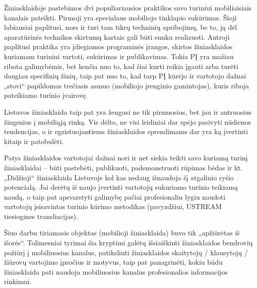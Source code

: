 \documentclass[kursinis-darbas]{vukf}
\begin{document}
%
%

\vukfConclusion

Žiniasklaidoje pastebimos dvi populiariausios praktikos savo turiniui mobiliaisiais kanalais pateikti. Pirmoji yra specialaus mobiliojo tinklapio sukūrimas. Šioji labiausiai paplitusi, nors ir turi tam tikrų techninių apribojimų, be to, ją dėl aparatūrinės technikos skirtumų kartais gali būti sunku realizuoti. Antroji paplitusi praktika yra įdiegiamos programinės įrangos, skirtos žiniasklaidos kuriamam turiniui vartoti, sukūrimas ir publikavimas. Tokia PĮ yra mažiau ribota galimybėmis, bet kenčia nuo to, kad šiai kurti reikia įgauti arba turėti daugiau specifinių žinių, taip pat nuo to, kad tarp PĮ kūrėjo ir vartotojo dažnai „stovi“ papildomas trečiasis asmuo (mobiliojo įrenginio gamintojas), kuris riboja pateikiamo turinio įvairovę.

Lietuvos žiniasklaida taip pat yra žengusi ne tik pirmuosius, bet jau ir antruosius žingsnius į mobiliąją rinką. Vis dėlto, ne visi leidiniai dar spėjo pasivyti nūdienos tendencijas, o ir egzistuojantiems žiniasklaidos sprendimams dar yra ką įvertinti kitaip ir patobulėti.

Patys žiniasklaidos vartotojai dažnai nori ir net siekia teikti savo kuriamą turinį žiniasklaidai – būti pastebėti, publikuoti, pademonstruoti rūpimas bėdas ir kt. „Didžioji“ žiniasklaida Lietuvoje kol kas nedaug išnaudoja šį atgalinio ryšio potencialą. Jai derėtų iš naujo įvertinti vartotojų sukuriamo turinio teikiamą naudą, o taip pat apsvarstyti galimybę pačiai profesionaliu lygiu naudoti vartotojų įsisavintas turinio kūrimo metodikas (pavyzdžiui, USTREAM tiesiogines transliacijas).

Šiuo darbu tiriamasis objektas (mobilioji žiniasklaida) buvo tik „apžiūrėtas iš išorės“. Tolimesniai tyrimai šia kryptimi galėtų išsiaiškinti žiniasklaidos bendrovių požiūrį į mobiliuosius kanalus, patikslinti žiniasklaidos skaitytojų / klausytojų / žiūrovų vartojimo įpročius ir motyvus, taip pat panagrinėti, kokiu būdu žiniasklaida pati naudoja mobiliuosius kanalus profesionalios informacijos rinkimui.


%
%


\end{document}
